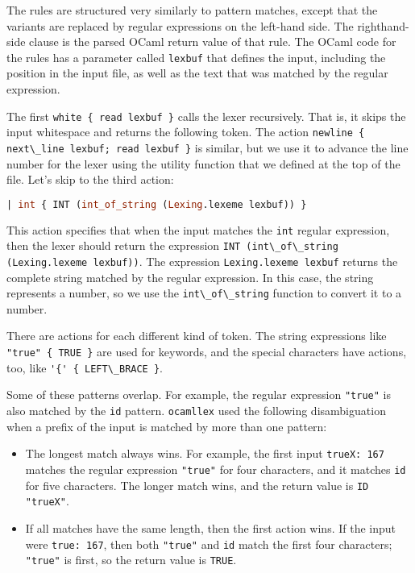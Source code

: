 The rules are structured very similarly to pattern matches, except that
the variants are replaced by regular expressions on the left-hand side.
The righthand-side clause is the parsed OCaml return value of that rule.
The OCaml code for the rules has a parameter called
\passthrough{\lstinline!lexbuf!} that defines the input, including the
position in the input file, as well as the text that was matched by the
regular expression. 

The first \passthrough{\lstinline!white \{ read lexbuf \}!} calls the
lexer recursively. That is, it skips the input whitespace and returns
the following token. The action
\passthrough{\lstinline!newline \{ next\_line lexbuf; read lexbuf \}!}
is similar, but we use it to advance the line number for the lexer using
the utility function that we defined at the top of the file. Let's skip
to the third action:

\begin{lstlisting}[language=Caml]
| int { INT (int_of_string (Lexing.lexeme lexbuf)) }
\end{lstlisting}

This action specifies that when the input matches the
\passthrough{\lstinline!int!} regular expression, then the lexer should
return the expression
\passthrough{\lstinline!INT (int\_of\_string (Lexing.lexeme lexbuf))!}.
The expression \passthrough{\lstinline!Lexing.lexeme lexbuf!} returns
the complete string matched by the regular expression. In this case, the
string represents a number, so we use the
\passthrough{\lstinline!int\_of\_string!} function to convert it to a
number.

There are actions for each different kind of token. The string
expressions like \passthrough{\lstinline!"true" \{ TRUE \}!} are used
for keywords, and the special characters have actions, too, like
\passthrough{\lstinline!'\{' \{ LEFT\_BRACE \}!}.

Some of these patterns overlap. For example, the regular expression
\passthrough{\lstinline!"true"!} is also matched by the
\passthrough{\lstinline!id!} pattern. \passthrough{\lstinline!ocamllex!}
used the following disambiguation when a prefix of the input is matched
by more than one pattern:

\begin{itemize}
\item
  The longest match always wins. For example, the first input
  \passthrough{\lstinline!trueX: 167!} matches the regular expression
  \passthrough{\lstinline!"true"!} for four characters, and it matches
  \passthrough{\lstinline!id!} for five characters. The longer match
  wins, and the return value is \passthrough{\lstinline!ID "trueX"!}.
\item
  If all matches have the same length, then the first action wins. If
  the input were \passthrough{\lstinline!true: 167!}, then both
  \passthrough{\lstinline!"true"!} and \passthrough{\lstinline!id!}
  match the first four characters; \passthrough{\lstinline!"true"!} is
  first, so the return value is \passthrough{\lstinline!TRUE!}.
\end{itemize}

